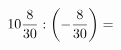 \documentclass[preview]{standalone}
\begin{document}
\begin{align*}
10 { 8 \over 30 }  :  \left( - { 8 \over 30 } \right)  =
\end{align*}
\end{document}
